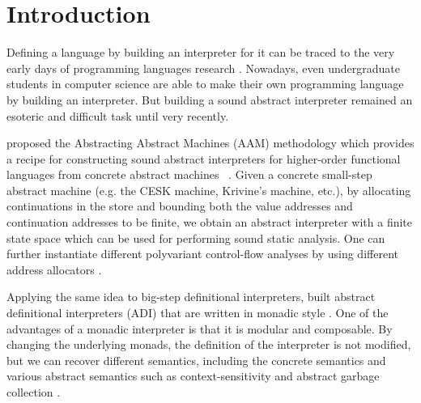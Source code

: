 \documentclass[acmsmall, review]{acmart}\settopmatter{}
\begin{document}


\maketitle


\section{Introduction}

Defining a language by building an interpreter for it can be traced to the very
early days of programming languages research \cite{landin1966next, Reynolds:72, 
McCarthy:1960:RFS:367177.367199}.
Nowadays, even undergraduate students in computer science are able to make their own
programming language by building an interpreter.
But building a sound abstract interpreter remained an esoteric and difficult task 
until very recently.

\citeauthor{van2012systematic} proposed the Abstracting Abstract Machines (AAM) 
methodology which provides a recipe for constructing sound abstract interpreters 
for higher-order functional languages from concrete abstract machines 
~\cite{van2012systematic, van2010abstracting}.
Given a concrete small-step abstract machine (e.g. the CESK machine, Krivine's 
machine, etc.), by allocating continuations in the store and bounding both the 
value addresses and continuation addresses to be finite, we obtain an abstract 
interpreter with a finite state space which can be used for performing sound 
static analysis.
One can further instantiate different polyvariant control-flow analyses by using
different address allocators \cite{Gilray:2016:ACP:2951913.2951936}.

Applying the same idea to big-step definitional interpreters, \citeauthor{darais2017abstracting}
built abstract definitional interpreters (ADI) that are written in monadic style 
\cite{darais2017abstracting}. One of the advantages of a monadic interpreter is 
that it is modular and composable. By changing the underlying monads, the definition
of the interpreter is not modified, but we can recover different semantics, including
the concrete semantics and various abstract semantics such as context-sensitivity and
abstract garbage collection \cite{Sergey:2013:MAI:2491956.2491979}.
\end{document}
